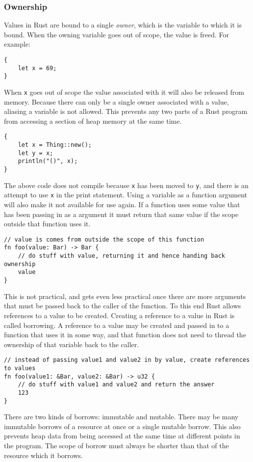 \subsubsection{Ownership}\label{sec:regions}
Values in Rust are bound to a single \textit{owner}, which is the variable to
which it is bound. When the owning variable goes out of scope, the value is
freed. For example:
\begin{lstlisting}[nolol, label={lst:rustScope}]
{
    let x = 69;
}
\end{lstlisting}
When \lstinline{x} goes out of scope the value associated with it will also be
released from memory. Because there can only be a single owner associated with
a value, aliasing a variable is not allowed. This prevents any two parts
of a Rust program from accessing a section of heap memory at the same time.
\begin{lstlisting}[nolol, label={lst:rustScope}]
{
    let x = Thing::new();
    let y = x;
    println("()", x);
}
\end{lstlisting}
The above code does not compile because \lstinline{x} has been moved to
\lstinline{y}, and there is an attempt to use \lstinline{x} in the print
statement. Using a variable as a function argument will also make it not
available for use again. If a function uses some value that has been passing in
as a argument it must return that same value if the scope outside that
function uses it.
\begin{lstlisting}[nolol, label={lst:rustScope}]
// value is comes from outside the scope of this function
fn foo(value: Bar) -> Bar {
    // do stuff with value, returning it and hence handing back ownership
    value
}
\end{lstlisting}
This is not practical, and gets even less practical once there are more
arguments that must be passed back to the caller of the function. To this end
Rust allows references to a value to be created. Creating a reference to a value
in Rust is called borrowing. A reference to a value may be created and passed
in to a function that uses it in some way, and that function does not need to
thread the ownership of that variable back to the caller.
\begin{lstlisting}[nolol, label={lst:rustScope}]
// instead of passing value1 and value2 in by value, create references to values
fn foo(value1: &Bar, value2: &Bar) -> u32 {
    // do stuff with value1 and value2 and return the answer
    123
}
\end{lstlisting}
There are two kinds of borrows: immutable and mutable. There may be many
immutable borrows of a resource at once or a single mutable borrow. This also
prevents heap data from being accessed at the same time at different points in
the program. The scope of borrow must always be shorter than that of the
resource which it borrows. 

